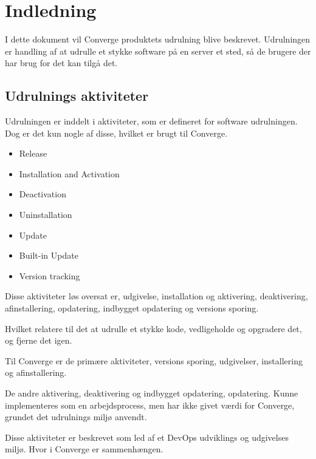 \chapter{Indledning}

I dette dokument vil Converge produktets udrulning blive beskrevet. Udrulningen er handling af at udrulle et stykke software på en server et sted, så de brugere der har brug for det kan tilgå det.


\section{Udrulnings aktiviteter}

Udrulningen er inddelt i aktiviteter, som er defineret for software udrulningen. Dog er det kun nogle af disse, hvilket er brugt til Converge.

\begin{itemize}
    \item Release
    \item Installation and Activation
    \item Deactivation
    \item Uninstallation
    \item Update
    \item Built-in Update
    \item Version tracking
\end{itemize}

Disse aktiviteter løs oversat er, udgivelse, installation og aktivering, deaktivering, afinstallering, opdatering, indbygget opdatering og versions sporing.

Hvilket relatere til det at udrulle et stykke kode, vedligeholde og opgradere det, og fjerne det igen.

Til Converge er de primære aktiviteter, versions sporing, udgivelser, installering og afinstallering.

De andre aktivering, deaktivering og indbygget opdatering, opdatering. Kunne implementeres som en arbejdsprocess, men har ikke givet værdi for Converge, grundet det udrulnings miljø anvendt.

Disse aktiviteter er beskrevet som led af et DevOps udviklings og udgivelses miljø. Hvor i Converge er sammenhængen.

